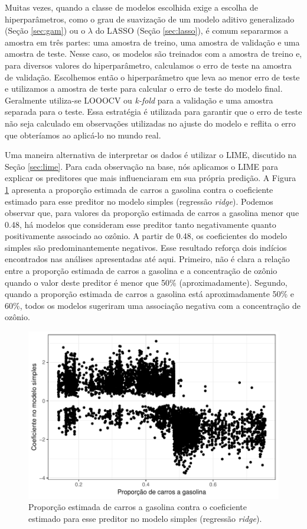 
Muitas vezes, quando a classe de modelos escolhida exige a escolha de hiperparâmetros, como o grau de suavização de um modelo aditivo generalizado (Seção \ref{sec:gam}) ou o $\lambda$ do LASSO (Seção \ref{sec:lasso}), é comum separarmos a amostra em três partes: uma amostra de treino, uma amostra de validação e uma amostra de teste. Nesse caso, os modelos são treinados com a amostra de treino e, para diversos valores do hiperparâmetro, calculamos o erro de teste na amostra de validação. Escolhemos então o hiperparâmetro que leva ao menor erro de teste e utilizamos a amostra de teste para calcular o erro de teste do modelo final. Geralmente utiliza-se LOOOCV ou \textit{k-fold} para a validação e uma amostra separada para o teste. Essa estratégia é utilizada para garantir que o erro de teste não seja calculado em observações utilizadas no ajuste do modelo e reflita o erro que obteríamos ao aplicá-lo no mundo real.



Uma maneira alternativa de interpretar os dados é utilizar o LIME, discutido na Seção \ref{sec:lime}. Para cada observação na base, nós aplicamos o LIME para explicar os preditores que mais influenciaram em sua própria predição. A Figura \ref{fig:cap-comb-lime-pinheiros} apresenta a proporção estimada de carros a gasolina contra o coeficiente estimado para esse preditor no modelo simples (regressão \textit{ridge}). Podemos observar que, para valores da proporção estimada de carros a gasolina menor que 0.48, há modelos que consideram esse preditor tanto negativamente quanto positivamente associado ao ozônio. A partir de 0.48, os coeficientes do modelo simples são predominantemente negativos. Esse resultado reforça dois indícios encontrados nas análises apresentadas até aqui. Primeiro, não é clara a relação entre a proporção estimada de carros a gasolina e a concentração de ozônio quando o valor deste preditor é menor que 50\% (aproximadamente). Segundo, quando a proporção estimada de carros a gasolina está aproximadamente 50\% e 60\%, todos os modelos sugeriram uma associação negativa com a concentração de ozônio.

\begin{figure}[h!]
	\centering
	\includegraphics[width=0.7\linewidth]{figuras/cap-comb-rf-explanation.pdf}
	\caption{Proporção estimada de carros a gasolina contra o coeficiente estimado para esse preditor no modelo simples (regressão \textit{ridge}).}
	\label{fig:cap-comb-lime-pinheiros}
\end{figure}

